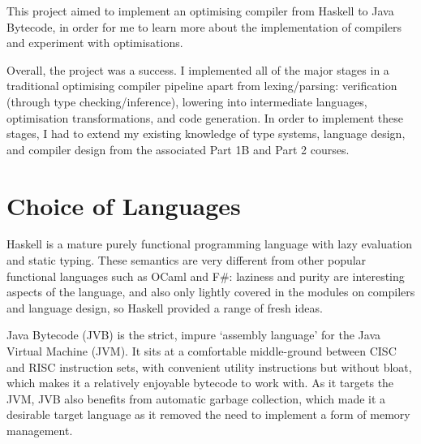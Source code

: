 \documentclass[dissertation.tex]{subfiles}
\begin{document}
This project aimed to implement an optimising compiler from Haskell to Java Bytecode, in order for me to learn more
about the implementation of compilers and experiment with optimisations.


Overall, the project was a success. I implemented all of the major stages in a traditional optimising compiler pipeline
apart from lexing/parsing: verification (through type checking/inference), lowering into intermediate languages,
optimisation transformations, and code generation. In order to implement these stages, I had to extend my existing
knowledge of type systems, language design, and compiler design from the associated Part 1B and Part 2 courses.

\section{Choice of Languages}
{

    Haskell is a mature purely functional programming language with lazy evaluation and static typing. These semantics
    are very different from other popular functional languages such as OCaml and F\#: laziness and purity are
    interesting aspects of the language, and also only lightly covered in the modules on compilers and language design,
    so Haskell provided a range of fresh ideas.

    Java Bytecode (JVB) is the strict, impure `assembly language' for the Java Virtual Machine (JVM). It sits at a
    comfortable middle-ground between CISC and RISC instruction sets, with convenient utility instructions but without
    bloat, which makes it a relatively enjoyable bytecode to work with. As it targets the JVM, JVB also benefits from
    automatic garbage collection, which made it a desirable target language as it removed the need to implement a form
    of memory management.

}
\end{document}
